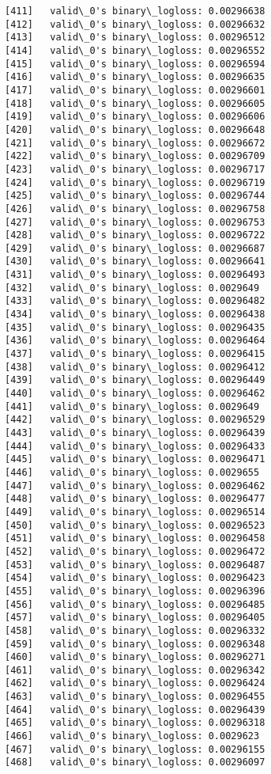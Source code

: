 \documentclass[11pt]{article}
\begin{document}
\begin{Verbatim}[commandchars=\\\{\}]
[411]	valid\_0's binary\_logloss: 0.00296638
[412]	valid\_0's binary\_logloss: 0.00296632
[413]	valid\_0's binary\_logloss: 0.00296512
[414]	valid\_0's binary\_logloss: 0.00296552
[415]	valid\_0's binary\_logloss: 0.00296594
[416]	valid\_0's binary\_logloss: 0.00296635
[417]	valid\_0's binary\_logloss: 0.00296601
[418]	valid\_0's binary\_logloss: 0.00296605
[419]	valid\_0's binary\_logloss: 0.00296606
[420]	valid\_0's binary\_logloss: 0.00296648
[421]	valid\_0's binary\_logloss: 0.00296672
[422]	valid\_0's binary\_logloss: 0.00296709
[423]	valid\_0's binary\_logloss: 0.00296717
[424]	valid\_0's binary\_logloss: 0.00296719
[425]	valid\_0's binary\_logloss: 0.00296744
[426]	valid\_0's binary\_logloss: 0.00296758
[427]	valid\_0's binary\_logloss: 0.00296753
[428]	valid\_0's binary\_logloss: 0.00296722
[429]	valid\_0's binary\_logloss: 0.00296687
[430]	valid\_0's binary\_logloss: 0.00296641
[431]	valid\_0's binary\_logloss: 0.00296493
[432]	valid\_0's binary\_logloss: 0.0029649
[433]	valid\_0's binary\_logloss: 0.00296482
[434]	valid\_0's binary\_logloss: 0.00296438
[435]	valid\_0's binary\_logloss: 0.00296435
[436]	valid\_0's binary\_logloss: 0.00296464
[437]	valid\_0's binary\_logloss: 0.00296415
[438]	valid\_0's binary\_logloss: 0.00296412
[439]	valid\_0's binary\_logloss: 0.00296449
[440]	valid\_0's binary\_logloss: 0.00296462
[441]	valid\_0's binary\_logloss: 0.0029649
[442]	valid\_0's binary\_logloss: 0.00296529
[443]	valid\_0's binary\_logloss: 0.00296439
[444]	valid\_0's binary\_logloss: 0.00296433
[445]	valid\_0's binary\_logloss: 0.00296471
[446]	valid\_0's binary\_logloss: 0.0029655
[447]	valid\_0's binary\_logloss: 0.00296462
[448]	valid\_0's binary\_logloss: 0.00296477
[449]	valid\_0's binary\_logloss: 0.00296514
[450]	valid\_0's binary\_logloss: 0.00296523
[451]	valid\_0's binary\_logloss: 0.00296458
[452]	valid\_0's binary\_logloss: 0.00296472
[453]	valid\_0's binary\_logloss: 0.00296487
[454]	valid\_0's binary\_logloss: 0.00296423
[455]	valid\_0's binary\_logloss: 0.00296396
[456]	valid\_0's binary\_logloss: 0.00296485
[457]	valid\_0's binary\_logloss: 0.00296405
[458]	valid\_0's binary\_logloss: 0.00296332
[459]	valid\_0's binary\_logloss: 0.00296348
[460]	valid\_0's binary\_logloss: 0.00296271
[461]	valid\_0's binary\_logloss: 0.00296342
[462]	valid\_0's binary\_logloss: 0.00296424
[463]	valid\_0's binary\_logloss: 0.00296455
[464]	valid\_0's binary\_logloss: 0.00296439
[465]	valid\_0's binary\_logloss: 0.00296318
[466]	valid\_0's binary\_logloss: 0.0029623
[467]	valid\_0's binary\_logloss: 0.00296155
[468]	valid\_0's binary\_logloss: 0.00296097

\end{Verbatim}
\end{document}
